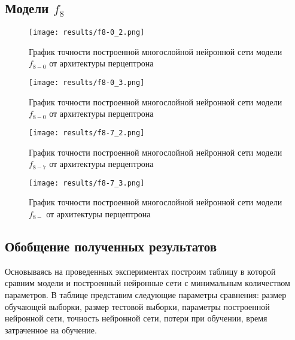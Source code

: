 \subsection{Модели $f_{8}$}

\bigskip


\begin{figure}[H]
	\texttt{[image: results/f8-0\_2.png]}
	
	\caption{График точности построенной многослойной нейронной сети модели $f_{8-0}$ от архитектуры перцептрона}
	
\end{figure}


\begin{figure}[H]
	\texttt{[image: results/f8-0\_3.png]}
	
	\caption{График точности построенной многослойной нейронной сети модели $f_{8-0}$ от архитектуры перцептрона}	
\end{figure}



\bigskip


\begin{figure}[H]
	\texttt{[image: results/f8-7\_2.png]}
	
	\caption{График точности построенной многослойной нейронной сети модели $f_{8-7}$ от архитектуры перцептрона}
	
\end{figure}


\begin{figure}[H]
	\texttt{[image: results/f8-7\_3.png]}
	
	\caption{График точности построенной многослойной нейронной сети модели $f_{8-}$ от архитектуры перцептрона}	
\end{figure}


  
\subsection{Обобщение полученных результатов}
Основываясь на проведенных экспериментах построим таблицу в которой сравним модели и построенный нейронные сети с минимальным количеством параметров.
В таблице представим следующие параметры сравнения:
размер обучающей выборки, размер тестовой выборки, параметры построенной нейронной сети, точность нейронной сети, потери при обучении, время затраченное на обучение.

